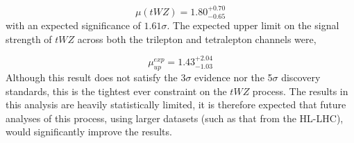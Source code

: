\begin{equation}
  \mu (tWZ) =   1.80^{+0.70}_{-0.65}
\end{equation}
with an expected significance of $1.61\sigma$. The expected upper limit on the signal strength of $tWZ$ across both the trilepton and tetralepton channels were,

\begin{equation}
  \mu_{up}^{exp} =   1.43^{+2.04}_{-1.03}
\end{equation}
 Although this result does not satisfy the 3$\sigma$ evidence nor the 5$\sigma$ discovery standards, this is the tightest ever constraint on the $tWZ$ process. The results in this analysis are heavily statistically limited, it is therefore expected that future analyses of this process, using larger datasets (such as that from the HL-LHC), would significantly improve the results.










